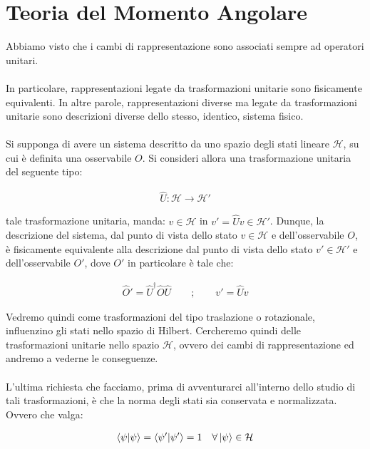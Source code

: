 \chapter{Teoria del Momento Angolare}

	Abbiamo visto che i cambi di rappresentazione sono associati sempre ad operatori unitari. 
	\\
	\\
	In particolare, rappresentazioni legate da trasformazioni unitarie sono fisicamente equivalenti. In altre parole, rappresentazioni diverse ma legate da trasformazioni unitarie sono descrizioni diverse dello stesso, identico, sistema fisico. 
	\\
	\\
	Si supponga di avere un sistema descritto da uno spazio degli stati lineare $\mathcal{H}$, su cui è definita una osservabile $O$. Si consideri allora una trasformazione unitaria del seguente tipo:
	
\begin{align*}
	\hat{U} : \mathcal{H} \to \mathcal{H}'
\end{align*}

	tale trasformazione unitaria, manda: $v \in \mathcal{H}$ in $v' = \hat{U}v \in \mathcal{H}'$. Dunque, la descrizione del sistema, dal punto di vista dello stato $v \in \mathcal{H}$ e dell'osservabile $O$, è fisicamente equivalente alla descrizione dal punto di vista dello stato $v' \in \mathcal{H}'$ e dell'osservabile $O'$, dove $O'$ in particolare è tale che:
	
\begin{align*}
	\hat{O}' = \hat{U}^{\dagger}\hat{O}\hat{U} \qquad ;  \qquad v' = \hat{U}v
\end{align*}
	
	Vedremo quindi come trasformazioni del tipo traslazione o rotazionale, influenzino gli stati nello spazio di Hilbert. Cercheremo quindi delle trasformazioni unitarie nello spazio $\mathcal{H}$, ovvero dei cambi di rappresentazione ed andremo a vederne le conseguenze.
	\\
	\\
	L'ultima richiesta che facciamo, prima di avventurarci all'interno dello studio di tali trasformazioni, è che la norma degli stati sia conservata e normalizzata. Ovvero che valga:
	
\begin{align*}
	\braket{\psi} = \braket{\psi'} = 1 \quad \forall \ket{\psi} \in \mathcal{H}
\end{align*}


